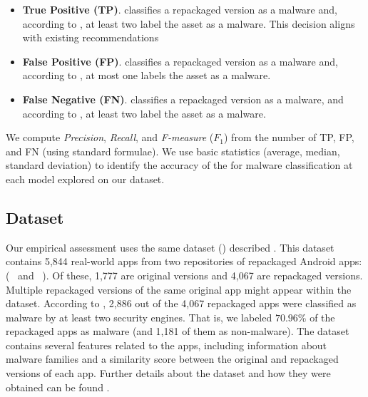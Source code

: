 \begin{itemize}
\item {\bf True Positive (TP)}. \droidxpflow classifies a repackaged version as a malware and, according to
  \vt, at least two \ses label the asset as a malware. This decision aligns with existing recommendations~\cite{vt-label,DBLP:journals/ese/KhanmohammadiEH19}
   
\item {\bf False Positive (FP)}. \droidxpflow classifies a repackaged version as a malware and, according to \vt, at most one \se labels the asset as a malware.

\item {\bf False Negative (FN)}. \droidxpflow classifies a repackaged version as a malware, and according to \vt, at least two \ses label the asset as a malware.
\end{itemize}

We compute \emph{Precision}, \emph{Recall}, and \emph{F-measure} ($F_1$) from
the number of TP, FP, and FN (using standard formulae). We use basic statistics (average, median, standard deviation) to identify the accuracy of the \ml
for malware classification at each model explored on our dataset.


\subsection{Dataset}\label{sec:dataset}



Our empirical assessment uses the same dataset (\cds) described \pw. This dataset contains 5,844 real-world apps from two
repositories of repackaged Android apps:(\repack~\cite{DBLP:journals/tse/LiBK21} and \amc~\cite{rafiq2022andromalpack}). Of these,
1,777 are original versions and 4,067 are repackaged versions. Multiple repackaged versions of the same original app might
appear within the \cds dataset. According to \vt, 2,886 out of the 4,067 repackaged apps were classified as malware by at least two security engines. That
is, we labeled $70.96$\% of the repackaged apps as malware (and 1,181 of them as non-malware). The \cds dataset contains several
features related to the apps, including information about malware families and a similarity score between the original and repackaged versions of each app.
Further details about the \cds dataset and how they were obtained can be found \pw.


